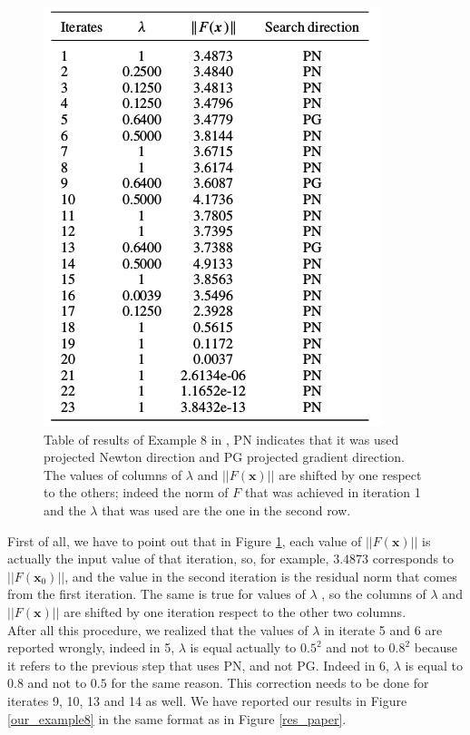 \begin{figure}[h]
	\centering
	\includegraphics[width=0.6\linewidth]{results_example8}
	\caption[Table of results of example 8 in \cite{MAIN}]{Table of results of Example 8 in \cite{MAIN}, PN indicates that it was used projected Newton direction and PG projected gradient direction. The values of columns of $ \lambda $ and $ ||F(\textbf{x})|| $ are shifted by one respect to the others; indeed the norm of $ F $ that was achieved in iteration 1 and the $ \lambda $ that was used are the one in the second row.}
	\label{results_example8}
\end{figure}
First of all, we have to point out that in Figure \ref{results_example8}, each value of $ ||F(\textbf{x})|| $ is actually the input value of that iteration, so, for example, $ 3.4873 $ corresponds to $ ||F(\textbf{x}_0)|| $, and the value in the second iteration is the residual norm that comes from the first iteration. The same is true for values of $ \lambda $ , so the columns of $ \lambda $ and $ ||F(\textbf{x})|| $ are shifted by one iteration respect to the other two columns.\\
After all this procedure, we realized that the values of $ \lambda $ in iterate 5 and 6 are reported wrongly, indeed in 5, $ \lambda $ is equal actually to $ 0.5^2 $ and not to $ 0.8^2 $ because it refers to the previous step that uses PN, and not PG. Indeed in 6, $ \lambda$ is equal to $0.8 $ and not to $ 0.5 $ for the same reason. This correction needs to be done for iterates 9, 10, 13 and 14 as well. We have reported our results in Figure \ref{our_example8} in the same format as in Figure \ref{res_paper}.\\
